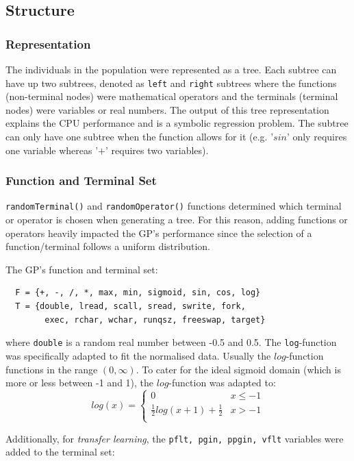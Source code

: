 \documentclass{article}
\begin{document}
\subsection{Structure}
\subsubsection{Representation}
The individuals in the population were represented as a tree. Each subtree can have up two subtrees, denoted as \texttt{left} and \texttt{right} subtrees where the functions (non-terminal nodes) were mathematical operators and the terminals (terminal nodes) were variables or real numbers. The output of this tree representation explains the CPU performance and is a symbolic regression problem. The subtree can only have one subtree when the function allows for it (e.g. '\(sin\)' only requires one variable whereas '\(+\)' requires two variables).

\subsubsection{Function and Terminal Set}
\texttt{randomTerminal()} and \texttt{randomOperator()} functions determined which terminal or operator is chosen when generating a tree. For this reason, adding functions or operators heavily impacted the GP's performance since the selection of a function/terminal follows a uniform distribution.

The GP's function and terminal set:
\begin{verbatim}
  F = {+, -, /, *, max, min, sigmoid, sin, cos, log}
  T = {double, lread, scall, sread, swrite, fork, 
        exec, rchar, wchar, runqsz, freeswap, target}
\end{verbatim}
where \texttt{double} is a random real number between -0.5 and 0.5. The \texttt{log}-function was specifically adapted to fit the normalised data. Usually the \(log\)-function functions in the range \((0,\infty)\). To cater for the ideal sigmoid domain (which is more or less between -1 and 1), the \(log\)-function was adapted to:
\[ log(x) = \begin{cases} 
      0 & x\leq -1 \\
      \frac{1}{2}log(x+1)+\frac{1}{2}  & x > -1 \\
   \end{cases}
\]

Additionally, for \emph{transfer learning}, the \texttt{pflt, pgin, ppgin, vflt} variables were added to the terminal set:
\end{document}
